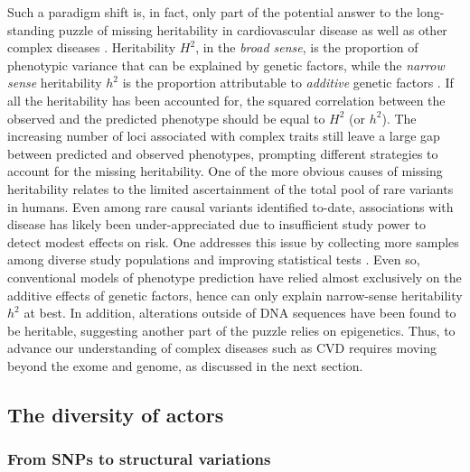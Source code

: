 \documentclass[letter]{bib}
\begin{document}
Such a paradigm shift is, in fact, only part of the potential answer to the long-standing puzzle of missing heritability in cardiovascular disease as well as other complex diseases \citep{Manolio:2009:Finding}. Heritability $H^2$, in the \textit{broad sense}, is the proportion of phenotypic variance that can be explained by genetic factors, while the \textit{narrow sense} heritability $h^2$ is the proportion attributable to \textit{additive} genetic factors \citep{Manolio:2009:Finding}.
If all the heritability has been accounted for, the squared correlation between the observed and the predicted phenotype should be equal to $H^2$ (or $h^2$). The increasing number of loci associated with complex traits still leave a large gap between predicted and observed phenotypes, prompting different strategies to account for the missing heritability.  One of the more obvious causes of missing heritability relates to the limited ascertainment of the total pool of rare variants in humans. Even among rare causal variants identified to-date, associations with disease has likely been under-appreciated due to insufficient study power to detect modest effects on risk. One addresses this issue by collecting more samples among diverse study populations \citep{Visscher:2017:10, Lek:2016:Analysis} and improving statistical tests \citep{Zuk:2014:Searching,Kaakinen:2017:rarevariant}. Even so, conventional models of phenotype prediction have relied almost exclusively on the additive effects of genetic factors, hence can only explain narrow-sense heritability $h^2$ at best. In addition, alterations outside of DNA sequences have been found to be heritable, suggesting another part of the puzzle relies on epigenetics. Thus, to advance our understanding of complex diseases such as CVD requires moving beyond the exome and genome, as discussed in the next section.
	
	
\subsection*{The diversity of actors}

\subsubsection*{From SNPs to structural variations}
\end{document}
